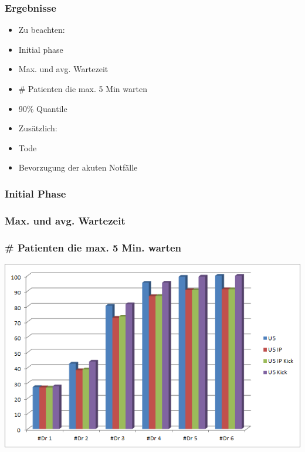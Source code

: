 \documentclass{beamer}
\begin{document}
\begin{frame}
\end{frame}



%
%
%
\begin{frame}
	\frametitle{Ergebnisse}
	\begin{minipage}{.5\textwidth}
		\begin{flushleft}		
			\begin{itemize}
				\item[] Zu beachten:
				\item Initial phase
				\item Max. und avg. Wartezeit
				\item \# Patienten die max. 5 Min warten
				\item 90\% Quantile
			\end{itemize}
		\end{flushleft}
	\end{minipage}
	\begin{minipage}{.4\textwidth}
		\begin{flushright}
			\begin{itemize}
				\item[] Zus\"{a}tzlich:
				\item Tode
				\item Bevorzugung der akuten Notf\"{a}lle
			\end{itemize}
		\end{flushright}
	\end{minipage}
\end{frame}

\begin{frame}
	\frametitle{Initial Phase}
\end{frame}

\begin{frame}
	\frametitle{Max. und avg. Wartezeit}
\end{frame}

\begin{frame}
	\frametitle{\# Patienten die max. 5 Min. warten}
	\begin{center}
		\includegraphics[scale=0.6]{img/U5.png}
	\end{center}
\end{frame}
\end{document}

